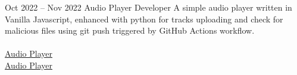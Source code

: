 \documentclass[
	10pt, %
	]{FreemanCV}
\begin{document}
\begin{paracol}{2}

\jobentry
	{Oct 2022 -- Nov 2022} %
	{} %
	{Audio Player} %
	{Developer} %
	{A simple audio player written in Vanilla Javascript, enhanced with python for tracks uploading and check for malicious files using git push triggered by GitHub Actions workflow.\\
	\\
	\raisebox{-1pt}{\faGithubSquare} \href{https://github.com/AndroiableDroid/audioplayer}{Audio Player}\\
	\raisebox{-1pt}{\faGlobe} \href{https://github.com/AndroiableDroid/audioplayer}{Audio Player}} %










\end{paracol}
\end{document}
